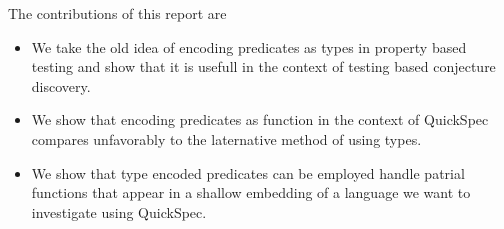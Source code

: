 The contributions of this report are
\begin{itemize}
    \item We take the old idea of encoding predicates as types
        in property based testing and show that it is usefull in
        the context of testing based conjecture discovery.

    \item We show that encoding predicates as function in the context
        of QuickSpec compares unfavorably to the laternative method
        of using types.

    \item We show that type encoded predicates can be employed handle
        patrial functions that appear in a shallow embedding of a language
        we want to investigate using QuickSpec.
\end{itemize}

